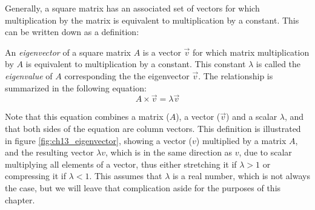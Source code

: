 \documentclass[
  letterpaper,
  DIV=11,
  numbers=noendperiod]{scrreprt}
\begin{document}
Generally, a square matrix has an associated set of vectors for which
multiplication by the matrix is equivalent to multiplication by a
constant. This can be written down as a definition:

\begin{tcolorbox}[enhanced jigsaw, coltitle=black, arc=.35mm, opacitybacktitle=0.6, breakable, bottomtitle=1mm, toptitle=1mm, titlerule=0mm, colback=white, leftrule=.75mm, rightrule=.15mm, colframe=quarto-callout-note-color-frame, colbacktitle=quarto-callout-note-color!10!white, opacityback=0, title=\textcolor{quarto-callout-note-color}{\faInfo}\hspace{0.5em}{Definition}, left=2mm, toprule=.15mm, bottomrule=.15mm]

An \emph{eigenvector} of a square matrix \(A\) is a vector \(\vec v\)
for which matrix multiplication by \(A\) is equivalent to multiplication
by a constant. This constant \(\lambda\) is called the \emph{eigenvalue}
of \(A\) corresponding the the eigenvector \(\vec v\). The relationship
is summarized in the following equation: \[
A  \times  \vec v = \lambda \vec v
\]

\end{tcolorbox}

Note that this equation combines a matrix (\(A\)), a vector (\(\vec v\))
and a scalar \(\lambda\), and that both sides of the equation are column
vectors. This definition is illustrated in figure
\ref{fig:ch13_eigenvector}, showing a vector (\(v\)) multiplied by a
matrix \(A\), and the resulting vector \(\lambda v\), which is in the
same direction as \(v\), due to scalar multiplying all elements of a
vector, thus either stretching it if \(\lambda>1\) or compressing it if
\(\lambda < 1\). This assumes that \(\lambda\) is a real number, which
is not always the case, but we will leave that complication aside for
the purposes of this chapter.
\end{document}
